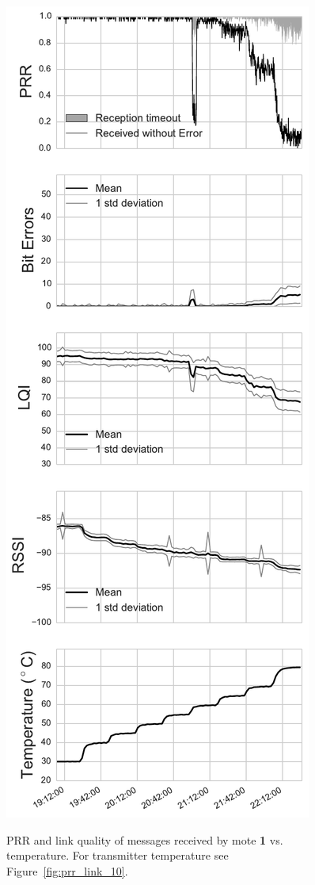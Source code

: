 \begin{figure}[t]
{		\includegraphics[width=0.475\columnwidth]{figures/prr_0-1_receiver}
		\label{fig:prr_link_01_receiver}
	}
	\caption{\acs{PRR} and link quality of messages received by mote \textbf{1} vs. temperature. For transmitter temperature see Figure~\ref{fig:prr_link_10}.}
	\label{fig:prr_link_01}
\end{figure}

